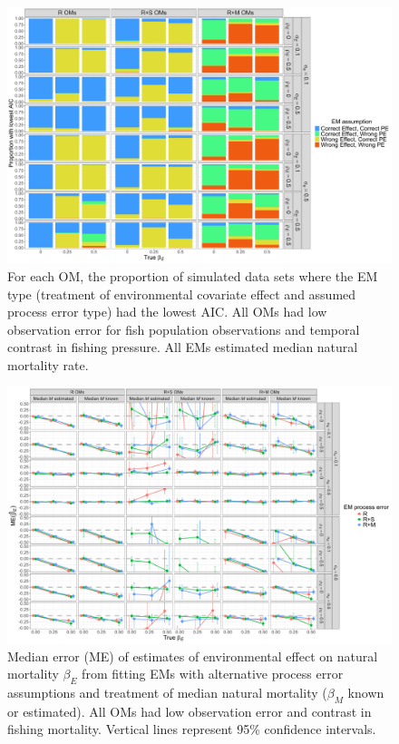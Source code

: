 \documentclass[
  12pt,
]{article}
\begin{document}
\begin{landscape}
\begin{figure}
\begin{center}
\includegraphics[height = \textheight]{aic_main}
\end{center}
\caption{For each OM, the proportion of simulated data sets where the EM type (treatment of environmental covariate effect and  assumed process error type) had the lowest AIC. All OMs had low observation error for fish population observations and temporal contrast in fishing pressure. All EMs estimated median natural mortality rate.}\label{aic}
\end{figure}
\end{landscape}

\begin{landscape}
\begin{figure}
\begin{center}
\includegraphics[height = \textheight]{beta_E_bias_main}
\end{center}
\caption{Median error (ME) of estimates of environmental effect on natural mortality $\beta_E$ from fitting EMs with alternative process error assumptions and treatment of median natural mortality ($\beta_M$ known or estimated). All OMs had low observation error and contrast in fishing mortality. Vertical lines represent 95\% confidence intervals.}\label{beta_E_bias}
\end{figure}
\end{landscape}
\end{document}
